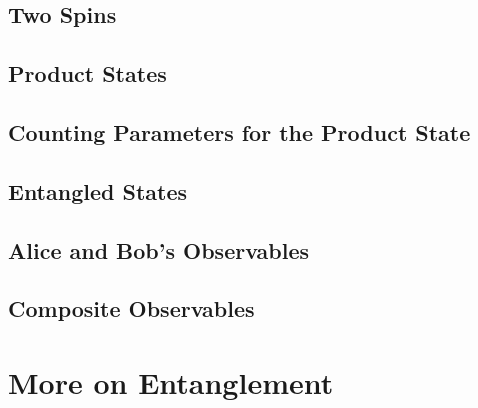 \documentclass[a4paper]{article}
\begin{document}
\subsection{Two Spins}
\subsection{Product States}

\subsection{Counting Parameters for the Product State}
\subsection{Entangled States}

\subsection{Alice and Bob's Observables}


\subsection{Composite Observables}


%
%
%
\section{More on Entanglement}
\end{document}
